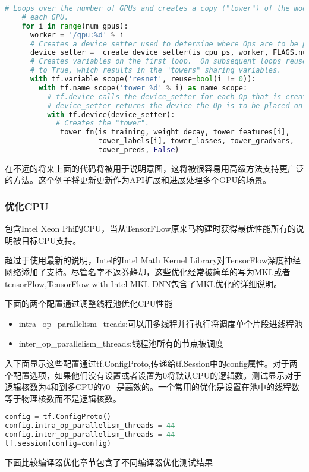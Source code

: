 \begin{lstlisting}[language=Python]
    # Loops over the number of GPUs and creates a copy ("tower") of the model on
    # each GPU.
    for i in range(num_gpus):
      worker = '/gpu:%d' % i
      # Creates a device setter used to determine where Ops are to be placed.
      device_setter = _create_device_setter(is_cpu_ps, worker, FLAGS.num_gpus)
      # Creates variables on the first loop.  On subsequent loops reuse is set
      # to True, which results in the "towers" sharing variables.
      with tf.variable_scope('resnet', reuse=bool(i != 0)):
        with tf.name_scope('tower_%d' % i) as name_scope:
          # tf.device calls the device_setter for each Op that is created.
          # device_setter returns the device the Op is to be placed on.
          with tf.device(device_setter):
            # Creates the "tower".
            _tower_fn(is_training, weight_decay, tower_features[i],
                      tower_labels[i], tower_losses, tower_gradvars,
                      tower_preds, False)
\end{lstlisting}
在不远的将来上面的代码将被用于说明意图，这将被很容易用高级方法支持更广泛的方法。这个\href{https://github.com/tensorflow/models/tree/master/tutorials/image/cifar10_estimator}{例子}将更新更新作为API扩展和进展处理多个GPU的场景。
\subsubsection{优化CPU}
包含Intel Xeon Phi的CPU，当从TensorFLow原来马构建时获得最优性能所有的说明被目标CPU支持。

超过于使用最新的说明，Intel的Intel Math Kernel Library对TensorFlow深度神经网络添加了支持。尽管名字不返券静却，这些优化经常被简单的写为MKL或者tensorFlow,\href{https://www.tensorflow.org/performance/performance_guide#tensorflow_with_intel_mkl_dnn}{TensorFlow with Intel MKL-DNN}包含了MKL优化的详细说明。

下面的两个配置通过调整线程池优化CPU性能
\begin{itemize}
\item intra\_op\_parallelism\_treads:可以用多线程并行执行将调度单个片段进线程池
\item inter\_op\_parallelism\_threads:线程池所有的节点被调度
\end{itemize}
入下面显示这些配置通过tf.ConfigProto,传递给tf.Session中的config属性。对于两个配置选项，如果他们没有设置或者设置为0将默认CPU的逻辑数。测试显示对于逻辑核数为4和到多CPU的70+是高效的。一个常用的优化是设置在池中的线程数等于物理核数而不是逻辑核数。
\begin{lstlisting}[language=Python]
config = tf.ConfigProto()
config.intra_op_parallelism_threads = 44
config.inter_op_parallelism_threads = 44
tf.session(config=config)
\end{lstlisting}
下面比较编译器优化章节包含了不同编译器优化测试结果

